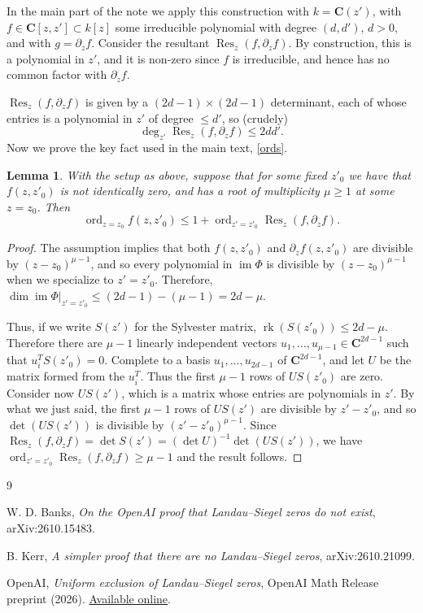 \documentclass[11pt,reqno]{amsart}
\numberwithin{equation}{section}
\newtheorem{lemma}[theorem]{Lemma}
\newcommand{\C}{\mathbf{C}}
\newcommand{\ord}{\operatorname{ord}}
\newcommand{\Res}{\operatorname{Res}}
\renewcommand{\le}{\leqslant}
\renewcommand{\ge}{\geqslant}
\begin{document}
In the main part of the note we apply this construction with $k = \C(z')$, with $f \in \C[z, z'] \subset k[z]$ some irreducible polynomial with degree $(d, d')$, $d > 0$, and with $g = \partial_z f$. Consider the resultant $\Res_z (f, \partial_z f)$. By construction, this is a polynomial in $z'$, and it is non-zero since $f$ is irreducible, and hence has no common factor with $\partial_z f$.

$\Res_z (f, \partial_z f)$ is given by a $(2d - 1) \times (2d - 1)$ determinant, each of whose entries is a polynomial in $z'$ of degree $\le d'$, so (crudely) 
\begin{equation}\label{resultant-degree} \deg_{z'} \Res_z (f, \partial_z f) \le 2 dd'.\end{equation}
Now we prove the key fact used in the main text, \eqref{ords}. 
\begin{lemma}\label{lema1}
With the setup as above, suppose that for some fixed $z'_0$ we have that $f(z, z'_0)$ is not identically zero, and has a root of multiplicity $\mu \ge 1$ at some $z = z_0$. Then
\[ \ord_{z = z_0} f(z, z'_0) \le 1 + \ord_{z' = z'_0} \Res_z(f, \partial_z f).\]
\end{lemma}
\begin{proof}
The assumption implies that both $f(z,z'_0)$ and $\partial_z f(z, z'_0)$ are divisible by $(z - z_0)^{\mu - 1}$, and so every polynomial in $\operatorname{im} \Phi$ is divisible by $(z - z_0)^{\mu - 1}$ when we specialize to $z' = z'_0$. Therefore, $\dim \operatorname{im} \Phi|_{z' = z'_0} \le (2 d - 1) - (\mu - 1) = 2d - \mu$.

Thus, if we write $S(z')$ for the Sylvester matrix, $\operatorname{rk} (S(z'_0)) \le 2d - \mu$. Therefore there are $\mu - 1$ linearly independent vectors $u_1,\dots, u_{\mu - 1} \in \C^{2d - 1}$ such that $u_i^T S(z'_0) = 0$.  Complete to a basis $u_1,\dots, u_{2d-1}$ of $\C^{2d - 1}$, and let $U$ be the matrix formed from the $u_i^T$. Thus the first $\mu - 1$ rows of $U S(z'_0)$ are zero. Consider now $U S(z')$, which is a matrix whose entries are polynomials in $z'$. By what we just said, the first $\mu - 1$ rows of $US(z')$ are divisible by $z' - z'_0$, and so $\det (US(z'))$ is divisible by $(z' - z'_0)^{\mu - 1}$. Since $\Res_z(f, \partial_z f) = \det S(z') = (\det U)^{-1} \det (US(z'))$, we have $\ord_{z' = z'_0} \Res_z(f, \partial_z f) \ge \mu - 1$ and the result follows.
\end{proof}



\begin{thebibliography}{9}

W. D. Banks,
\emph{On the OpenAI proof that Landau--Siegel zeros do not exist},
arXiv:2610.15483.

B. Kerr,
\emph{A simpler proof that there are no Landau--Siegel zeros},
arXiv:2610.21099.

OpenAI,
\emph{Uniform exclusion of Landau--Siegel zeros},
OpenAI Math Release preprint (2026).
\href{https://github.com/openai/math/blob/main/preprints/Uniform-exclusion-of-Landau-Siegel-zeros-October-1-2026/paper.pdf}
{Available online}.

\end{thebibliography}
\end{document}
